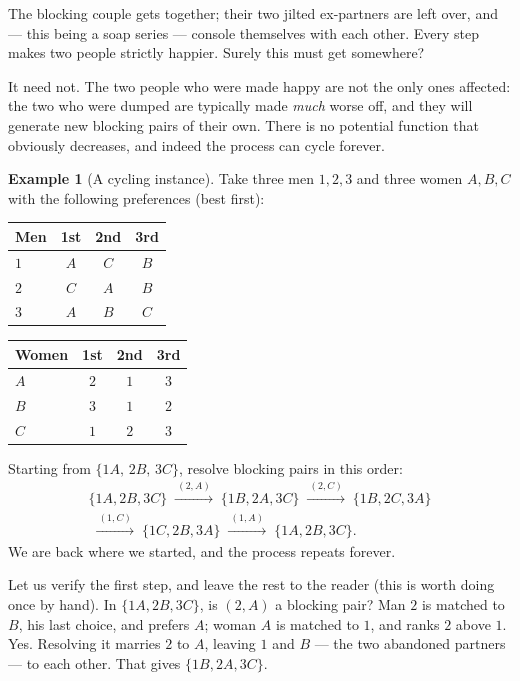 \documentclass[11pt,a4paper]{article}
\theoremstyle{plain}
\theoremstyle{definition}
\newtheorem{example}[theorem]{Example}
\theoremstyle{remark}
\begin{document}
The blocking couple gets together; their two jilted ex-partners are left over,
and --- this being a soap series --- console themselves with each other. Every
step makes two people strictly happier. Surely this must get somewhere?

It need not. The two people who were made happy are not the only ones affected:
the two who were dumped are typically made \emph{much} worse off, and they will
generate new blocking pairs of their own. There is no potential function that
obviously decreases, and indeed the process can cycle forever.

\begin{example}[A cycling instance]\label{ex:cycle}
Take three men $1,2,3$ and three women $A,B,C$ with the following preferences
(best first):
\begin{center}
\begin{tabular}{@{}lccc@{}}
\toprule
\textbf{Men} & 1st & 2nd & 3rd \\
\midrule
$1$ & $A$ & $C$ & $B$ \\
$2$ & $C$ & $A$ & $B$ \\
$3$ & $A$ & $B$ & $C$ \\
\bottomrule
\end{tabular}
\hspace{2em}
\begin{tabular}{@{}lccc@{}}
\toprule
\textbf{Women} & 1st & 2nd & 3rd \\
\midrule
$A$ & $2$ & $1$ & $3$ \\
$B$ & $3$ & $1$ & $2$ \\
$C$ & $1$ & $2$ & $3$ \\
\bottomrule
\end{tabular}
\end{center}
Starting from $\{1A,\,2B,\,3C\}$, resolve blocking pairs in this order:
\begin{gather*}
\{1A,2B,3C\}
\;\xrightarrow{\ (2,A)\ }\;
\{1B,2A,3C\}
\;\xrightarrow{\ (2,C)\ }\;
\{1B,2C,3A\}\\[0.3em]
\;\xrightarrow{\ (1,C)\ }\;
\{1C,2B,3A\}
\;\xrightarrow{\ (1,A)\ }\;
\{1A,2B,3C\}.
\end{gather*}
We are back where we started, and the process repeats forever.
\end{example}

Let us verify the first step, and leave the rest to the reader (this is worth
doing once by hand). In $\{1A,2B,3C\}$, is $(2,A)$ a blocking pair? Man $2$ is
matched to $B$, his last choice, and prefers $A$; woman $A$ is matched to $1$,
and ranks $2$ above $1$. Yes. Resolving it marries $2$ to $A$, leaving $1$ and
$B$ --- the two abandoned partners --- to each other. That gives
$\{1B, 2A, 3C\}$.
\end{document}
